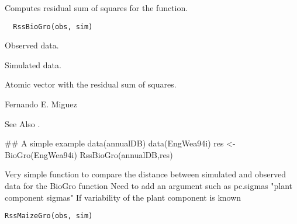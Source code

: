 \documentclass[letterpaper]{book}
\begin{document}
%
\begin{Description}\relax
Computes residual sum of squares for the
 function.
\end{Description}
%
\begin{Usage}
\begin{verbatim}
  RssBioGro(obs, sim)
\end{verbatim}
\end{Usage}
%
\begin{Arguments}
\begin{ldescription}
\item[\code{obs}] Observed data.

\item[\code{sim}] Simulated data.
\end{ldescription}
\end{Arguments}
%
\begin{Value}
Atomic vector with the residual sum of squares.
\end{Value}
%
\begin{Author}\relax
Fernando E. Miguez
\end{Author}
%
\begin{SeeAlso}\relax
See Also .
\end{SeeAlso}
%
\begin{Examples}
\begin{ExampleCode}
## A simple example
data(annualDB)
data(EngWea94i)
res <- BioGro(EngWea94i)
RssBioGro(annualDB,res)
\end{ExampleCode}
\end{Examples}
%
\begin{Description}\relax
Very simple function to compare the distance between
simulated and observed data for the BioGro function Need to
add an argument such as pc.sigmas "plant component sigmas"
If variability of the plant component is known
\end{Description}
%
\begin{Usage}
\begin{verbatim}
RssMaizeGro(obs, sim)
\end{verbatim}
\end{Usage}
\end{document}
